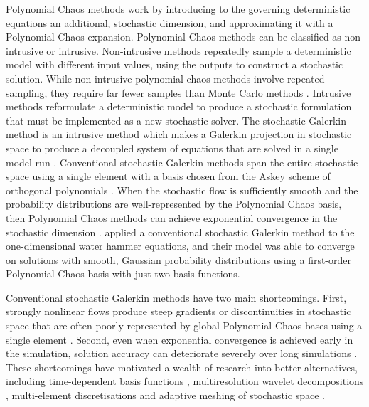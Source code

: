 Polynomial Chaos methods work by introducing to the governing deterministic equations an additional, stochastic dimension, and approximating it with a  Polynomial Chaos expansion.
Polynomial Chaos methods can be classified as non-intrusive or intrusive.
Non-intrusive methods repeatedly sample a deterministic model with different input values, using the outputs to construct a stochastic solution.
While non-intrusive polynomial chaos methods involve repeated sampling, they require far fewer samples than Monte Carlo methods \citep{ge2008,ge2011}.
Intrusive methods reformulate a deterministic model to produce a stochastic formulation that must be implemented as a new stochastic solver.
The stochastic Galerkin method is an intrusive method which makes a Galerkin projection in stochastic space to produce a decoupled system of equations that are solved in a single model run .
Conventional stochastic Galerkin methods span the entire stochastic space using a single element with a basis chosen from the Askey scheme of orthogonal polynomials \citep{xiu-karniadakis2002}.
When the stochastic flow is sufficiently smooth and the probability distributions are well-represented by the Polynomial Chaos basis, then Polynomial Chaos methods can achieve exponential convergence in the stochastic dimension \citep{xiu-karniadakis2003}.
\citet{sattar-elbeltagy2017} applied a conventional stochastic Galerkin method to the one-dimensional water hammer equations, and their model was able to converge on solutions with smooth, Gaussian probability distributions using a first-order Polynomial Chaos basis with just two basis functions.

Conventional stochastic Galerkin methods have two main shortcomings.
First, strongly nonlinear flows produce steep gradients or discontinuities in stochastic space that are often poorly represented by global Polynomial Chaos bases using a single element \citep{pettersson2014}.
Second, even when exponential convergence is achieved early in the simulation, solution accuracy can deteriorate severely over long simulations \citep{gerritsma2010}.
These shortcomings have motivated a wealth of research into better alternatives, including time-dependent basis functions \citep{gerritsma2010}, multiresolution wavelet decompositions \citep{lemaitre2004a}, multi-element discretisations and adaptive meshing of stochastic space \citep{wan-karniadakis2006,tryoen2010a,pettersson2014,li-stinis2015}.

